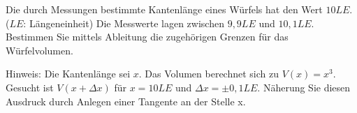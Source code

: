 \item
Die durch Messungen bestimmte Kantenlänge eines Würfels hat den Wert $10LE$. ($LE$: Längeneinheit) Die Messwerte lagen zwischen $9{,}9 LE$ und $10{,}1 LE$. Bestimmen Sie mittels Ableitung die zugehörigen Grenzen für das Würfelvolumen.

Hinweis: Die Kantenlänge sei $x$. Das Volumen berechnet sich zu $V(x) = x^3$. Gesucht ist $V(x+\Delta x)$ für $x=10 LE$ und $\Delta x = \pm 0{,}1 LE$. Näherung Sie diesen Ausdruck durch Anlegen einer Tangente an der Stelle x.
